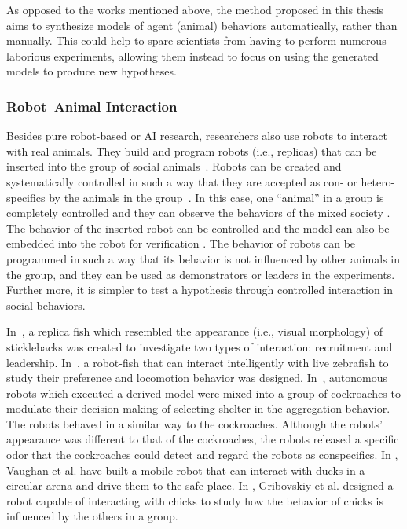 As opposed to the works mentioned above, the method proposed in this thesis aims to synthesize models of agent (animal) behaviors automatically, rather than manually. This could help to spare scientists from having to perform numerous laborious experiments, allowing them instead to focus on using the generated models to produce new hypotheses. 

\subsubsection{Robot--Animal Interaction}\label{sec:robot_animal_interaction}

Besides pure robot-based or AI research, researchers also use robots to interact with real animals. They build and program robots (i.e., replicas) that can be inserted into the group of social animals~\cite{Faria2010, Halloy2013, J.Halloy2007, Thomas2013, Vaughan2000}. Robots can be created and systematically controlled in such a way that they are accepted as con- or hetero-specifics by the animals in the group~\cite{Krause2011}. In this case, one ``animal'' in a group is completely controlled and they can observe the behaviors of the mixed society \cite{J.Halloy_2007}. The behavior of the inserted robot can be controlled and the model can also be embedded into the robot for verification \cite{Krause_2011}. The behavior of robots can be programmed in such a way that its behavior is not influenced by other animals in the group, and they can be used as demonstrators or leaders in the experiments. Further more, it is simpler to test a hypothesis through controlled interaction in social behaviors. 

In~\cite{Faria2010}, a replica fish which resembled the appearance (i.e., visual morphology) of sticklebacks was created to investigate two types of interaction: recruitment and leadership. In~\citep{Kopman2013}, a robot-fish that can interact intelligently with live zebrafish to study their preference and locomotion behavior was designed. In~\cite{J.Halloy2007}, autonomous robots which executed a derived model were mixed into a group of cockroaches to modulate their decision-making of selecting shelter in the aggregation behavior. The robots behaved in a similar way to the cockroaches. Although the robots' appearance was different to that of the cockroaches, the robots released a specific odor that the cockroaches could detect and regard the robots as conspecifics. In \cite{Vaughan_1998, Vaughan2000}, Vaughan et al. have built a mobile robot that can interact with ducks in a circular arena and drive them to the safe place. In \cite{Gribovskiy_2010}, Gribovskiy et al. designed a robot capable of interacting with chicks to study how the behavior of chicks is influenced by the others in a group.  

